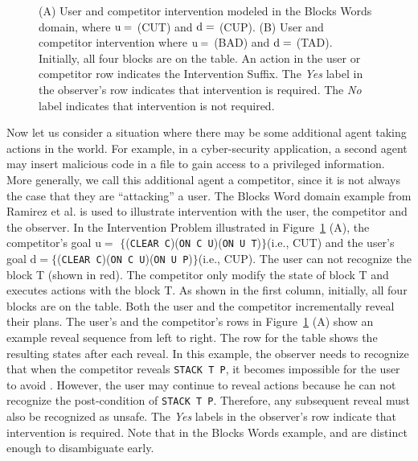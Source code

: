 \begin{figure}[tpb]
   \caption{(A) User and competitor intervention modeled in the Blocks Words domain, where $\mathrm{u}=$ (CUT) and $\mathrm{d}=$ (CUP). (B) User and competitor intervention where $\mathrm{u}= $ (BAD) and $\mathrm{d}= $ (TAD). \\ Initially, all four blocks are on the table. An action in the user or competitor row indicates the Intervention Suffix. The \textit{Yes} label in the observer's row indicates that intervention is required. The \textit{No} label indicates that intervention is not required.}
\label{fig:bw2}
\end{figure}

Now let us consider a situation where there may be some additional agent taking actions in the world.
For example, in a cyber-security application, a second agent may insert malicious code in a file to gain access to a privileged information.
More generally, we call this additional agent a competitor, since it is not always the case that they are ``attacking'' a user.
The Blocks Word domain example from Ramirez et al. \citeyear{ramirez2009plan} is used to illustrate intervention with the user, the competitor and the observer. 
In the Intervention Problem illustrated in Figure~\ref{fig:bw2} (A), the competitor's goal $\mathrm{u}=$ $\lbrace$(\texttt{CLEAR C})(\texttt{ON C U})(\texttt{ON U T})$\rbrace$(i.e., CUT) and the user's goal $\mathrm{d}=\lbrace$(\texttt{CLEAR C})(\texttt{ON C U})(\texttt{ON U P})$\rbrace$(i.e., CUP). The user can not recognize the block T (shown in red). The competitor only modify the state of block T and executes actions with the block T. As shown in the first column, initially, all four blocks are on the table. 
Both the user and the competitor incrementally reveal their plans.
The user's and the competitor's rows in Figure~\ref{fig:bw2} (A) show an example reveal sequence from left to right. 
The row for the table shows the resulting states after each reveal.
In this example, the observer needs to recognize that when the competitor reveals \texttt{STACK T P}, it becomes impossible for the user to avoid \undesired. 
However, the user may continue to reveal actions because he can not recognize the post-condition of \texttt{STACK T P}. 
Therefore, any subsequent reveal must also be recognized as unsafe.
The \textit{Yes} labels in the observer's row indicate that intervention is required. 
Note that in the Blocks Words example, \desired and \undesired are distinct enough to disambiguate early.


